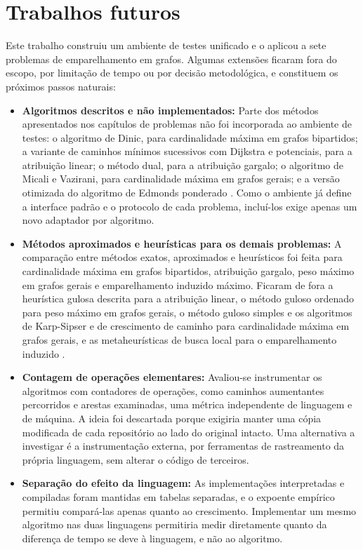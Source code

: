 
\chapter{Trabalhos futuros}
\label{cap:trabalhos_futuros}

Este trabalho construiu um ambiente de testes unificado e o aplicou a sete problemas de emparelhamento em grafos. Algumas extensões ficaram fora do escopo, por limitação de tempo ou por decisão metodológica, e constituem os próximos passos naturais:

\begin{itemize}
    \item \textbf{Algoritmos descritos e não implementados:} Parte dos métodos apresentados nos capítulos de problemas não foi incorporada ao ambiente de testes: o algoritmo de Dinic, para cardinalidade máxima em grafos bipartidos; a variante de caminhos mínimos sucessivos com Dijkstra e potenciais, para a atribuição linear; o método dual, para a atribuição gargalo; o algoritmo de Micali e Vazirani, para cardinalidade máxima em grafos gerais; e a versão otimizada do algoritmo de Edmonds ponderado \cite{galil_micali_gabow}. Como o ambiente já define a interface padrão e o protocolo de cada problema, incluí-los exige apenas um novo adaptador por algoritmo.
    \item \textbf{Métodos aproximados e heurísticas para os demais problemas:} A comparação entre métodos exatos, aproximados e heurísticos foi feita para cardinalidade máxima em grafos bipartidos, atribuição gargalo, peso máximo em grafos gerais e emparelhamento induzido máximo. Ficaram de fora a heurística gulosa descrita para a atribuição linear, o método guloso ordenado para peso máximo em grafos gerais, o método guloso simples e os algoritmos de Karp-Sipser e de crescimento de caminho para cardinalidade máxima em grafos gerais, e as metaheurísticas de busca local para o emparelhamento induzido \cite{furst}.
    \item \textbf{Contagem de operações elementares:} Avaliou-se instrumentar os algoritmos com contadores de operações, como caminhos aumentantes percorridos e arestas examinadas, uma métrica independente de linguagem e de máquina. A ideia foi descartada porque exigiria manter uma cópia modificada de cada repositório ao lado do original intacto. Uma alternativa a investigar é a instrumentação externa, por ferramentas de rastreamento da própria linguagem, sem alterar o código de terceiros.
    \item \textbf{Separação do efeito da linguagem:} As implementações interpretadas e compiladas foram mantidas em tabelas separadas, e o expoente empírico permitiu compará-las apenas quanto ao crescimento. Implementar um mesmo algoritmo nas duas linguagens permitiria medir diretamente quanto da diferença de tempo se deve à linguagem, e não ao algoritmo.

\end{itemize}
